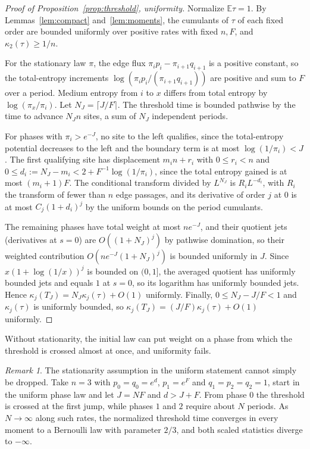 \documentclass[11pt]{article}
\theoremstyle{remark}
\newtheorem{remark}[theorem]{Remark}
\newcommand{\E}{\mathbb E}
\begin{document}
\begin{proof}[Proof of Proposition~\ref{prop:threshold}, uniformity]
Normalize $\E\tau=1$. By Lemmas~\ref{lem:compact} and~\ref{lem:moments}, the
cumulants of $\tau$ of each fixed order are bounded uniformly over positive
rates with fixed $n,F$, and $\kappa_2(\tau)\ge1/n$.

For the stationary law $\pi$, the edge flux $\pi_ip_i-\pi_{i+1}q_{i+1}$ is a
positive constant, so the total-entropy increments
$\log(\pi_ip_i/(\pi_{i+1}q_{i+1}))$ are positive and sum to $F$ over a
period. Medium entropy from $i$ to $x$ differs from total entropy by
$\log(\pi_x/\pi_i)$. Let $N_J=\lceil J/F\rceil$. The threshold time is
bounded pathwise by the time to advance $N_Jn$ sites, a sum of $N_J$
independent periods.

For phases with $\pi_i>e^{-J}$, no site to the left qualifies, since the
total-entropy potential decreases to the left and the boundary term is at
most $\log(1/\pi_i)<J$. The first qualifying site has displacement
$m_in+r_i$ with $0\le r_i<n$ and $0\le d_i:=N_J-m_i<2+F^{-1}\log(1/\pi_i)$,
since the total entropy gained is at most $(m_i+1)F$. The conditional
transform divided by $L^{N_J}$ is $R_iL^{-d_i}$, with $R_i$ the transform of
fewer than $n$ edge passages, and its derivative of order $j$ at $0$ is at
most $C_j(1+d_i)^j$ by the uniform bounds on the period cumulants.

The remaining phases have total weight at most $ne^{-J}$, and their
quotient jets (derivatives at $s=0$) are $O((1+N_J)^j)$ by pathwise
domination, so their weighted contribution $O(ne^{-J}(1+N_J)^j)$ is bounded
uniformly in $J$. Since $x(1+\log(1/x))^j$ is bounded on $(0,1]$, the averaged
quotient has uniformly bounded jets and equals $1$ at $s=0$, so its
logarithm has uniformly bounded jets. Hence
$\kappa_j(T_J)=N_J\kappa_j(\tau)+O(1)$ uniformly. Finally,
$0\le N_J-J/F<1$ and $\kappa_j(\tau)$ is uniformly bounded, so
$\kappa_j(T_J)=(J/F)\kappa_j(\tau)+O(1)$ uniformly.
\end{proof}

Without stationarity, the initial law can put weight on a phase from which
the threshold is crossed almost at once, and uniformity fails.

\begin{remark}
The stationarity assumption in the uniform statement cannot simply be
dropped. Take $n=3$ with $p_0=q_0=e^d$, $p_1=e^F$ and $q_1=p_2=q_2=1$, start
in the uniform phase law and let $J=NF$ and $d>J+F$. From phase $0$ the
threshold is crossed at the first jump, while phases $1$ and $2$ require
about $N$ periods. As $N\to\infty$ along such rates, the normalized threshold
time converges in every moment to a Bernoulli law with parameter $2/3$, and
both scaled statistics diverge to $-\infty$.
\end{remark}
\end{document}
